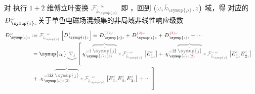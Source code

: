 对  执行 $1+2$ 维傅立叶变换 $\mathcolor{gray}{\mathcal F_{\bar{k}_{\symup{\rho}}}^{-\omega}}$ 即 ，回到 $\left( \mathcolor{gray}{\omega}, \mathcolor{gray}{\bar{k}_{\symup{\rho}}}, \mathcolor{gray}{z} \right)$ 域，得  对应的 $\Xint{\mathcolor{gray}{-}}{255}{D}^{\;\!\mathcolor{gray}{\omega}}_{\;\! \symup{\iota}\mathcolor{gray}{z}}$关于单色电磁场混频集的非局域非线性响应级数
\begin{subequations}
	\abovedisplayskip=6pt
	\belowdisplayskip=6pt
\begin{align}
	\Xint{\mathcolor{gray}{-}}{30}{D}^{\;\!\mathcolor{gray}{\omega}}_{\;\! \symup{\iota}\mathcolor{gray}{z}} &:= \mathcolor{gray}{\mathcal F_{\bar{k}_{\symup{\rho}}}^{-\omega}} \left[ D^{\;\! \mathcolor{gray}{t}}_{\;\! \symup{\iota}\mathcolor{gray}{z}} \right] = \Xint{\mathcolor{gray}{-}}{30}{D}^{\;\! \textcolor{Maroon}{(1)} \mathcolor{gray}{\omega}}_{\;\! \symup{\iota}\mathcolor{gray}{z}} + \Xint{\mathcolor{gray}{-}}{30}{D}^{\;\! \textcolor{Maroon}{(2)} \mathcolor{gray}{\omega}}_{\;\! \symup{\iota}\mathcolor{gray}{z}} + \Xint{\mathcolor{gray}{-}}{30}{D}^{\;\! \textcolor{Maroon}{(3)} \mathcolor{gray}{\omega}}_{\;\! \symup{\iota}\mathcolor{gray}{z}} + \cdots \\ &\hphantom{:}= {\symup{\varepsilon_0}} \mathcolor{gray}{\underbrace{\nabla_{\check{\jmath}}}} \left[ \Xint{{}^{}_{\mathcolor{gray}{-}}}{23}{\chi}^{\;\! \mathcolor{gray}{\omega} \hat{1} \;\! \mathcolor{gray}{\overbrace{\check{\symup{\jmath}}}}}_{\;\! \symup{\iota} \mathcolor{gray}{z} \textcolor{Maroon}{(1)}} \mathcolor{gray}{*} \mathcolor{gray}{\mathcal F_{\bar{k}_{\symup{\rho}}}^{-\omega}} \left[ E^{\;\!\mathcolor{gray}{t}}_{\;\! \hat{1} \mathcolor{gray}{z}} \right] + \Xint{{}^{}_{\mathcolor{gray}{-}}}{23}{\chi}^{\;\! \mathcolor{gray}{\omega} \hat{1} \hat{2} \;\! \mathcolor{gray}{\overbrace{\check{\symup{\jmath}}}}}_{\;\! \symup{\iota} \mathcolor{gray}{z} \textcolor{Maroon}{(2)}} \mathcolor{gray}{*} \mathcolor{gray}{\mathcal F_{\bar{k}_{\symup{\rho}}}^{-\omega}} \left[ E^{\;\!\mathcolor{gray}{t}}_{\;\! \hat{1} \mathcolor{gray}{z}} E^{\;\!\mathcolor{gray}{t}}_{\;\! \hat{2} \mathcolor{gray}{z}} \right] \right. \label{eq:D_wkrho} \\ &\hphantom{:}+ \left. \Xint{{}^{}_{\mathcolor{gray}{-}}}{23}{\chi}^{\;\! \mathcolor{gray}{\omega} \hat{1} \hat{2} \hat{3} \;\! \mathcolor{gray}{\overbrace{\check{\symup{\jmath}}}}}_{\;\! \symup{\iota} \mathcolor{gray}{z} \textcolor{Maroon}{(3)}} \mathcolor{gray}{*} \mathcolor{gray}{\mathcal F_{\bar{k}_{\symup{\rho}}}^{-\omega}} \left[ E^{\;\!\mathcolor{gray}{t}}_{\;\! \hat{1} \mathcolor{gray}{z}} E^{\;\!\mathcolor{gray}{t}}_{\;\! \hat{2} \mathcolor{gray}{z}} E^{\;\!\mathcolor{gray}{t}}_{\;\! \hat{3} \mathcolor{gray}{z}} \right] + \cdots \right]

\end{align}
\end{subequations}
